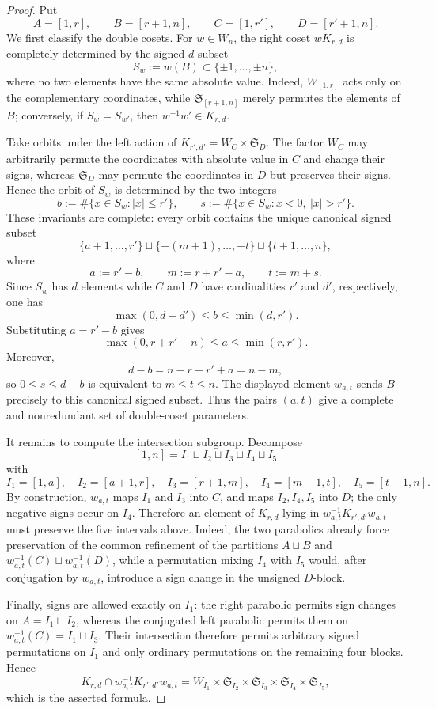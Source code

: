 \documentclass[12pt]{amsart}
\numberwithin{itemcounter}{subsection}
\theoremstyle{plain}
\theoremstyle{definition}
\theoremstyle{remark}
\numberwithin{equation}{section}
\def\min{{\operatorname{min}\nolimits}}
\begin{document}
\begin{proof}
Put
\[
A=[1,r],\qquad B=[r+1,n],\qquad
C=[1,r'],\qquad D=[r'+1,n].
\]
We first classify the double cosets.  For $w\in W_n$, the right coset
$wK_{r,d}$ is completely determined by the signed $d$-subset
\[
S_w:=w(B)\subset\{\pm1,\ldots,\pm n\},
\]
where no two elements have the same absolute value.  Indeed,
$W_{[1,r]}$ acts only on the complementary coordinates, while
$\mathfrak S_{[r+1,n]}$ merely permutes the elements of $B$; conversely,
if $S_w=S_{w'}$, then $w^{-1}w'\in K_{r,d}$.

Take orbits under the left action of
$K_{r',d'}=W_C\times\mathfrak S_D$.  The factor $W_C$ may arbitrarily
permute the coordinates with absolute value in $C$ and change their
signs, whereas $\mathfrak S_D$ may permute the coordinates in $D$ but
preserves their signs.  Hence the orbit of $S_w$ is determined by the two
integers
\[
b:=\#\{x\in S_w:|x|\le r'\},
\qquad
s:=\#\{x\in S_w:x<0,\ |x|>r'\}.
\]
These invariants are complete: every orbit contains the unique canonical
signed subset
\[
\{a+1,\ldots,r'\}
\sqcup
\{-(m+1),\ldots,-t\}
\sqcup
\{t+1,\ldots,n\},
\]
where
\[
a:=r'-b,\qquad
m:=r+r'-a,\qquad
t:=m+s.
\]
Since $S_w$ has $d$ elements while $C$ and $D$ have cardinalities
$r'$ and $d'$, respectively, one has
\[
\max(0,d-d')\le b\le\min(d,r').
\]
Substituting $a=r'-b$ gives
\[
\max(0,r+r'-n)\le a\le\min(r,r').
\]
Moreover,
\[
d-b=n-r-r'+a=n-m,
\]
so $0\le s\le d-b$ is equivalent to $m\le t\le n$.
The displayed element $w_{a,t}$ sends $B$ precisely to this canonical
signed subset.  Thus the pairs $(a,t)$ give a complete and nonredundant
set of double-coset parameters.

It remains to compute the intersection subgroup.  Decompose
\[
[1,n]=I_1\sqcup I_2\sqcup I_3\sqcup I_4\sqcup I_5
\]
with
\[
I_1=[1,a],\quad I_2=[a+1,r],\quad I_3=[r+1,m],
\quad I_4=[m+1,t],\quad I_5=[t+1,n].
\]
By construction, $w_{a,t}$ maps $I_1$ and $I_3$ into $C$, and maps
$I_2,I_4,I_5$ into $D$; the only negative signs occur on $I_4$.
Therefore an element of $K_{r,d}$ lying in
$w_{a,t}^{-1}K_{r',d'}w_{a,t}$ must preserve the five intervals above.
Indeed, the two parabolics already force preservation of the common
refinement of the partitions $A\sqcup B$ and
$w_{a,t}^{-1}(C)\sqcup w_{a,t}^{-1}(D)$, while a permutation mixing
$I_4$ with $I_5$ would, after conjugation by $w_{a,t}$, introduce a sign
change in the unsigned $D$-block.

Finally, signs are allowed exactly on $I_1$: the right parabolic permits
sign changes on $A=I_1\sqcup I_2$, whereas the conjugated left parabolic
permits them on $w_{a,t}^{-1}(C)=I_1\sqcup I_3$.  Their intersection
therefore permits arbitrary signed permutations on $I_1$ and only
ordinary permutations on the remaining four blocks.  Hence
\[
K_{r,d}\cap w_{a,t}^{-1}K_{r',d'}w_{a,t}
=
W_{I_1}\times\mathfrak S_{I_2}\times\mathfrak S_{I_3}
\times\mathfrak S_{I_4}\times\mathfrak S_{I_5},
\]
which is the asserted formula.
\end{proof}
\end{document}
